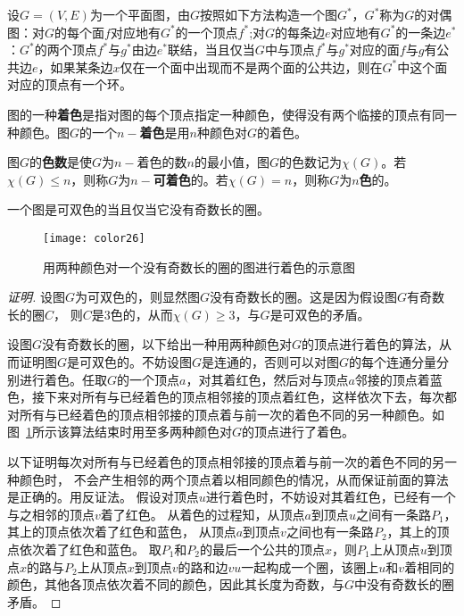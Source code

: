   \begin{Def}
    设$G=(V,E)$为一个平面图，由$G$按照如下方法构造一个图$G^*$，$G^*$称为$G$的对偶图：对$G$的每个面$f$对应地有$G^*$的一个顶点$f^*$;对$G$的每条边$e$对应地有$G^*$的一条边$e^*$：$G^*$的两个顶点$f^*$与$g^*$由边$e^*$联结，当且仅当$G$中与顶点$f^*$与$g^*$对应的面$f$与$g$有公共边$e$，如果某条边$x$仅在一个面中出现而不是两个面的公共边，则在$G^*$中这个面对应的顶点有一个环。
  \end{Def}
  \begin{Def}
    图的一种{\bfseries 着色}是指对图的每个顶点指定一种颜色，使得没有两个临接的顶点有同一种颜色。图$G$的一个{\bfseries $n-$着色}是用$n$种颜色对$G$的着色。
  \end{Def}
  \begin{Def}
    图$G$的{\bfseries 色数}是使$G$为$n-$着色的数$n$的最小值，图$G$的色数记为$\chi(G)$。若$\chi (G) \leq n$，则称$G$为{\bfseries $n-$可着色}的。若$\chi (G) = n$，则称$G$为{\bfseries $n$色}的。
  \end{Def}
  \begin{Thm}
    一个图是可双色的当且仅当它没有奇数长的圈。
  \end{Thm}
  \renewcommand{\figurename}{图}
\begin{figure}\centering
  \texttt{[image: color26]}
      \caption{用两种颜色对一个没有奇数长的圈的图进行着色的示意图}
    \label{fig:twocoloring}  
    \end{figure}
    \begin{proof}[证明]
    设图$G$为可双色的，则显然图$G$没有奇数长的圈。这是因为假设图$G$有奇数长的圈$C$，
    则$C$是3色的，从而$\chi(G) \geq 3$，与$G$是可双色的矛盾。

      设图$G$没有奇数长的圈，以下给出一种用两种颜色对$G$的顶点进行着色的算法，从而证明图$G$是可双色的。不妨设图$G$是连通的，否则可以对图$G$的每个连通分量分别进行着色。任取$G$的一个顶点$a$，对其着红色，然后对与顶点$a$邻接的顶点着蓝色，接下来对所有与已经着色的顶点相邻接的顶点着红色，这样依次下去，每次都对所有与已经着色的顶点相邻接的顶点着与前一次的着色不同的另一种颜色。如图~\ref{fig:twocoloring}所示该算法结束时用至多两种颜色对$G$的顶点进行了着色。

以下证明每次对所有与已经着色的顶点相邻接的顶点着与前一次的着色不同的另一种颜色时，
不会产生相邻的两个顶点着以相同颜色的情况，从而保证前面的算法是正确的。用反证法。
假设对顶点$u$进行着色时，不妨设对其着红色，已经有一个与之相邻的顶点$v$着了红色。
从着色的过程知，从顶点$a$到顶点$u$之间有一条路$P_1$，其上的顶点依次着了红色和蓝色，
从顶点$a$到顶点$v$之间也有一条路$P_2$，其上的顶点依次着了红色和蓝色。
取$P_1$和$P_2$的最后一个公共的顶点$x$，则$P_1$上从顶点$u$到顶点$x$的路与$P_2$上从顶点$x$到顶点$v$的路和边$vu$一起构成一个圈，该圈上$u$和$v$着相同的颜色，其他各顶点依次着不同的颜色，因此其长度为奇数，与$G$中没有奇数长的圈矛盾。 
  \end{proof}

